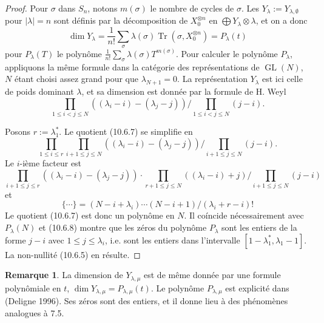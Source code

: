 \documentclass[11pt,a4paper]{article}
\theoremstyle{plain}
\theoremstyle{definition}
\newtheorem{remark}[theorem]{Remarque}
\DeclareMathOperator{\Tr}{Tr}
\DeclareMathOperator{\GL}{GL}
\begin{document}
\begin{proof}
Pour $\sigma$ dans $S_n$, notons $m(\sigma)$ le nombre de cycles de $\sigma$. Les $Y_\lambda := Y_{\lambda, \emptyset}$ pour $|\lambda| = n$ sont d\'efinis par la d\'ecomposition de $X_0^{\otimes n}$ en $\bigoplus Y_\lambda \otimes \lambda$, et on a donc
\begin{equation}
\dim Y_\lambda = \frac{1}{n!} \sum_\sigma \lambda(\sigma) \Tr(\sigma, X_0^{\otimes n}) = P_\lambda(t) \tag{10.6.6}
\end{equation}
pour $P_\lambda(T)$ le polyn\^ome $\frac{1}{n!} \sum_\sigma \lambda(\sigma) T^{m(\sigma)}$. Pour calculer le polyn\^ome $P_\lambda$, appliquons la m\^eme formule dans la cat\'egorie des repr\'esentations de $\GL(N)$, $N$ \'etant choisi assez grand pour que $\lambda_{N+1} = 0$. La repr\'esentation $Y_\lambda$ est ici celle de poids dominant $\lambda$, et sa dimension est donn\'ee par la formule de H. Weyl
\begin{equation}
\prod_{1 \leq i < j \leq N} ((\lambda_i - i) - (\lambda_j - j)) \Big/ \prod_{1 \leq i < j \leq N} (j - i). \tag{10.6.7}
\end{equation}

Posons $r := \lambda^*_1$. Le quotient (10.6.7) se simplifie en
\begin{equation}
\prod_{1 \leq i \leq r} \prod_{i+1 \leq j \leq N} ((\lambda_i - i) - (\lambda_j - j)) \Big/ \prod_{i+1 \leq j \leq N} (j - i). \tag{10.6.8}
\end{equation}
Le $i$-i\`eme facteur est
\[
\prod_{i+1 \leq j \leq r} ((\lambda_i - i) - (\lambda_j - j)) \cdot \prod_{r+1 \leq j \leq N} ((\lambda_i - i) + j) \Big/ \prod_{i+1 \leq j \leq N} (j - i)
\]
et
\[
\{ \cdots \} = (N - i + \lambda_i) \cdots (N - i + 1) / (\lambda_i + r - i)!
\]
Le quotient (10.6.7) est donc un polyn\^ome en $N$. Il co\'incide n\'ecessairement avec $P_\lambda(N)$ et (10.6.8) montre que les z\'eros du polyn\^ome $P_\lambda$ sont les entiers de la forme $j - i$ avec $1 \leq j \leq \lambda_i$, i.e. sont les entiers dans l'intervalle $[1 - \lambda^*_1, \lambda_1 - 1]$. La non-nullit\'e (10.6.5) en r\'esulte.
\end{proof}

\begin{remark}
La dimension de $Y_{\lambda, \mu}$ est de m\^eme donn\'ee par une formule polyn\^omiale en $t$, $\dim Y_{\lambda, \mu} = P_{\lambda, \mu}(t)$. Le polyn\^ome $P_{\lambda, \mu}$ est explicit\'e dans (Deligne 1996). Ses z\'eros sont des entiers, et il donne lieu \`a des ph\'enom\`enes analogues \`a 7.5.
\end{remark}
\end{document}
